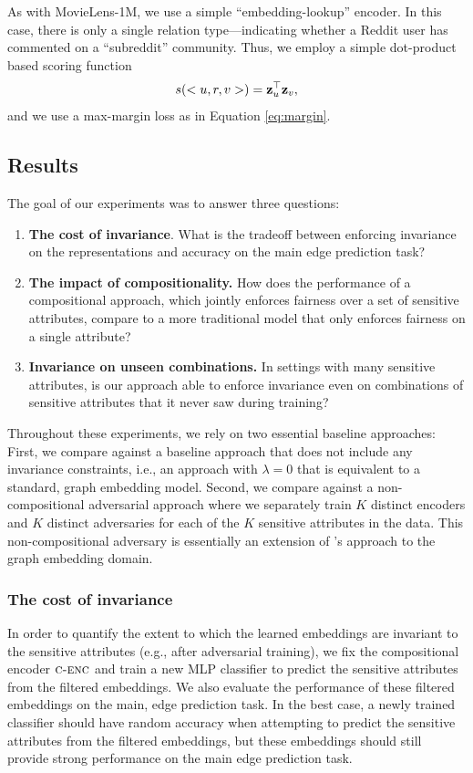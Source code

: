 As with MovieLens-1M, we use a simple ``embedding-lookup'' encoder. 
In this case, there is only a single relation type---indicating whether a Reddit user has commented on a ``subreddit'' community.
Thus, we employ a simple dot-product based scoring function
\begin{equation*}
    s(<u, r, v>) = \mathbf{z}_u^\top\mathbf{z}_v,
\end{equation*}
and we use a max-margin loss as in Equation \eqref{eq:margin}. 

\subsection{Results}

The goal of our experiments was to answer three questions:
\begin{enumerate}[label={(\bf Q\arabic*)}, topsep=0pt, parsep=0pt, leftmargin=25pt]
    \item \textbf{The cost of invariance}. What is the tradeoff between enforcing invariance on the representations and accuracy on the main edge prediction task?
    \item \textbf{The impact of compositionality.} How does the performance of a compositional approach, which jointly enforces fairness over a set of sensitive attributes, compare to a more traditional model that only enforces fairness on a single attribute?
    \item \textbf{Invariance on unseen combinations.} In settings with many sensitive attributes, is our approach able to enforce invariance even on combinations of sensitive attributes that it never saw during training? 
\end{enumerate}
Throughout these experiments, we rely on two essential baseline approaches: First, we compare against a baseline approach that does not include any invariance constraints, i.e., an approach with $\lambda=0$ that is equivalent to a standard, graph embedding model. 
Second, we compare against a non-compositional adversarial approach where we separately train $K$ distinct encoders and $K$ distinct adversaries for each of the $K$ sensitive attributes in the data. 
This non-compositional adversary is essentially an extension of \CITE's approach to the graph embedding domain. 

\subsubsection{The cost of invariance}
In order to quantify the extent to which the learned embeddings are invariant to the sensitive attributes (e.g., after adversarial training), we fix the compositional encoder $\textsc{c-enc}$ and train a new MLP classifier to predict the sensitive attributes from the filtered embeddings. 
We also evaluate the performance of these filtered embeddings on the main, edge prediction task. 
In the best case, a newly trained classifier should have random accuracy when attempting to predict the sensitive attributes from the filtered embeddings, but these embeddings should still provide strong performance on the main edge prediction task. 

